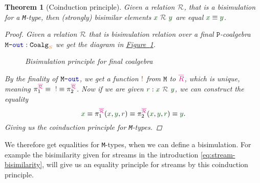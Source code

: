 \documentclass[twoside,11pt,openright]{report}
\theoremstyle{plain} %
\newtheorem{thm}{Theorem}[section]
\theoremstyle{definition}
\theoremstyle{remark}
\newcommand*{\figref}[1]{\hyperref[fig:#1]{Figure~\ref*{fig:#1}}}
\newcommand*{\term}[1]{\textcolor{green!30!black}{#1}} %
\newcommand*{\type}[1]{\textcolor{magenta!90!black}{#1}}
\newcommand*{\container}[1]{\textcolor{orange}{#1}}
\newcommand*{\coalg}[2]{#1\texttt{-}#2}
\newcommand*{\relation}[1]{\textcolor{gray!75!black}{\ensuremath{\mathtt{#1}}}}
\newcommand*{\constant}[1]{\textcolor{orange!60!black}{\ensuremath{\mathtt{#1}}}}
\newcommand*{\function}[1]{\textcolor{blue!60!black}{\ensuremath{\mathtt{#1}}}}
\newcommand*{\typeformer}[1]{\ensuremath{\mathtt{#1}}}
\newcommand*{\functor}[1]{\ensuremath{\mathbf{\mathtt{#1}}}}
\begin{document}
\begin{thm}[Coinduction principle]
  \label{thm:M-coinduction-principle}
  Given a relation \(\relation{\mathcal{R}}\), that is a bisimulation for a \texttt{M}-type, then (strongly) bisimilar elements \(\term{x}~\relation{\mathcal{R}}~\term{y}\) are equal \(\term{x} \equiv \term{y}\).  
  \begin{proof}
    Given a relation \(\relation{\mathcal{R}}\) that is bisimulation relation over a final \(\functor{P}\)-coalgebra \(\coalg{\typeformer{M}}{\function{out}}:\mathtt{Coalg}_{\container{S}}\) we get the diagram in \figref{final-coalgebra-coinduction}.
    \begin{figure}[h]
      \centering
      \caption{Bisimulation principle for final coalgebra}
      \label{fig:final-coalgebra-coinduction}
    \end{figure}
    By the finality of \(\coalg{\typeformer{M}}{\function{out}}\), we get a function \(\constant{!}\) from \(\typeformer{M}\) to \(\type{\overline{R}}\), which is unique, meaning \(\pi_1^{\type{\overline{\mathcal{R}}}} \equiv ~\constant{!} \equiv \pi_2^{\type{\overline{\mathcal{R}}}}\). Now if we are given \(\term{r} : \term{x}~\relation{\mathcal{R}}~\term{y}\), we can construct the equality
    \begin{equation}
      \term{x} \equiv \pi_1^{\type{\overline{\mathcal{R}}}} (\term{x}, \term{y}, \term{r}) \equiv \pi_2^{\type{\overline{\mathcal{R}}}} (\term{x}, \term{y}, \term{r}) \equiv \term{y}.
    \end{equation}
    Giving us the coinduction principle for \texttt{M}-types.
  \end{proof}
\end{thm}
\noindent We therefore get equalities for \texttt{M}-types, when we can define a bisimulation. For example the bisimilarity given for streams in the introduction \eqref{eq:stream-bisimilarity}, will give us an equality principle for streams by this coinduction principle.

\end{document}
